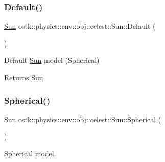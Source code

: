 \mbox{\label{classostk_1_1physics_1_1env_1_1obj_1_1celest_1_1_sun_afb5fc16a88e0f2bdbbb977ffb4263dbc}} 
\subsubsection{\texorpdfstring{Default()}{Default()}}
{\footnotesize\ttfamily \hyperlink{classostk_1_1physics_1_1env_1_1obj_1_1celest_1_1_sun}{Sun} ostk\+::physics\+::env\+::obj\+::celest\+::\+Sun\+::\+Default (\begin{DoxyParamCaption}{ }\end{DoxyParamCaption})\hspace{0.3cm}{\ttfamily [static]}}



Default \hyperlink{classostk_1_1physics_1_1env_1_1obj_1_1celest_1_1_sun}{Sun} model (Spherical) 

\begin{DoxyReturn}{Returns}
\hyperlink{classostk_1_1physics_1_1env_1_1obj_1_1celest_1_1_sun}{Sun} 
\end{DoxyReturn}
\mbox{\label{classostk_1_1physics_1_1env_1_1obj_1_1celest_1_1_sun_af389e90646fdc8e438caa2d31f9b54b5}} 
\subsubsection{\texorpdfstring{Spherical()}{Spherical()}}
{\footnotesize\ttfamily \hyperlink{classostk_1_1physics_1_1env_1_1obj_1_1celest_1_1_sun}{Sun} ostk\+::physics\+::env\+::obj\+::celest\+::\+Sun\+::\+Spherical (\begin{DoxyParamCaption}{ }\end{DoxyParamCaption})\hspace{0.3cm}{\ttfamily [static]}}



Spherical model. 

